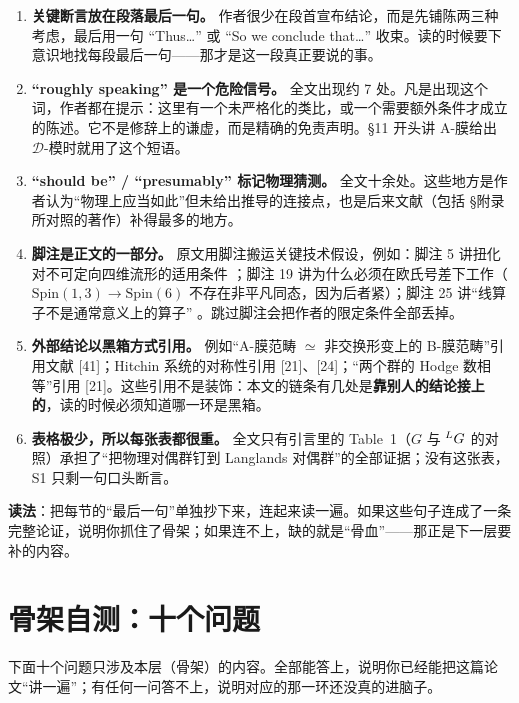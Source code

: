 \begin{enumerate}[label=(\roman*)]
\item \textbf{关键断言放在段落最后一句。} 作者很少在段首宣布结论，而是先铺陈两三种考虑，最后用一句 “Thus\ldots” 或 “So we conclude that\ldots” 收束。读的时候要下意识地找每段最后一句——那才是这一段真正要说的事。
\item \textbf{“roughly speaking” 是一个危险信号。} 全文出现约 7 处。凡是出现这个词，作者都在提示：这里有一个未严格化的类比，或一个需要额外条件才成立的陈述。它不是修辞上的谦虚，而是精确的免责声明。§11 开头讲 A-膜给出 $\mathcal{D}$-模时就用了这个短语。
\item \textbf{“should be” / “presumably” 标记物理猜测。} 全文十余处。这些地方是作者认为“物理上应当如此”但未给出推导的连接点，也是后来文献（包括 \S 附录所对照的著作）补得最多的地方。
\item \textbf{脚注是正文的一部分。} 原文用脚注搬运关键技术假设，例如：脚注 5 讲扭化对不可定向四维流形的适用条件 ；脚注 19 讲为什么必须在欧氏号差下工作（$ \mathrm{Spin}(1,3)\to\mathrm{Spin}(6)$ 不存在非平凡同态，因为后者紧）；脚注 25 讲“线算子不是通常意义上的算子” 。跳过脚注会把作者的限定条件全部丢掉。
\item \textbf{外部结论以黑箱方式引用。} 例如“A-膜范畴 $\simeq$ 非交换形变上的 B-膜范畴”引用文献 [41]；Hitchin 系统的对称性引用 [21]、[24]；“两个群的 Hodge 数相等”引用 [21]。这些引用不是装饰：本文的链条有几处是\textbf{靠别人的结论接上的}，读的时候必须知道哪一环是黑箱。
\item \textbf{表格极少，所以每张表都很重。} 全文只有引言里的 Table~1（$G$ 与 ${}^{L}G$ 的对照）承担了“把物理对偶群钉到 Langlands 对偶群”的全部证据；没有这张表，S1 只剩一句口头断言。
\end{enumerate}

\begin{keyidea}
\textbf{读法}：把每节的“最后一句”单独抄下来，连起来读一遍。如果这些句子连成了一条完整论证，说明你抓住了骨架；如果连不上，缺的就是“骨血”——那正是下一层要补的内容。
\end{keyidea}

\section{骨架自测：十个问题}

下面十个问题只涉及本层（骨架）的内容。全部能答上，说明你已经能把这篇论文“讲一遍”；有任何一问答不上，说明对应的那一环还没真的进脑子。

